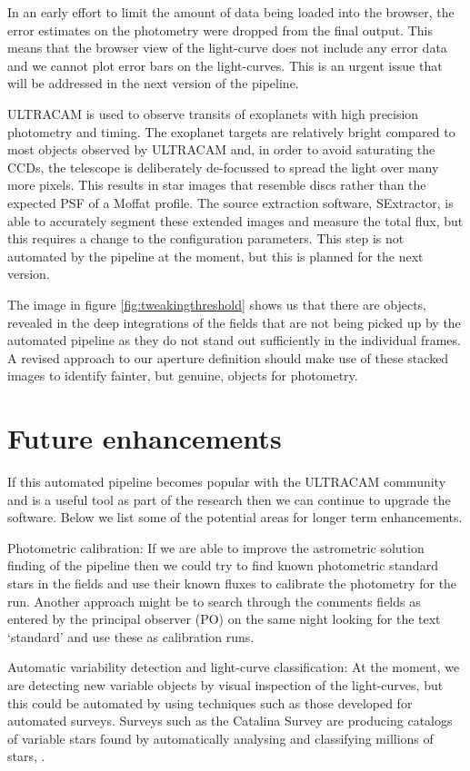 In an early effort to limit the amount of data being loaded into the browser, the error estimates on the photometry were dropped from the final output. This means that the browser view of the light-curve does not include any error data and we cannot plot error bars on the light-curves. This is an urgent issue that will be addressed in the next version of the pipeline. 

ULTRACAM is used to observe transits of exoplanets with high precision photometry and timing. The exoplanet targets are relatively bright compared to most objects observed by ULTRACAM and, in order to avoid saturating the CCDs, the telescope is deliberately de-focussed to spread the light over many more pixels. This results in star images that resemble discs rather than the expected PSF of a Moffat profile. The source extraction software, SExtractor, is able to accurately segment these extended images and measure the total flux, but this requires a change to the configuration parameters. This step is not automated by the pipeline at the moment, but this is planned for the next version. 

The image in figure \ref{fig:tweakingthreshold} shows us that there are objects, revealed in the deep integrations of the fields that are not being picked up by the automated pipeline as they do not stand out sufficiently in the individual frames. A revised approach to our aperture definition should make use of these stacked images to identify fainter, but genuine, objects for photometry. 

\section{Future enhancements}
If this automated pipeline becomes popular with the ULTRACAM community and is a useful tool as part of the research then we can continue to upgrade the software. Below we list some of the potential areas for longer term enhancements.

{Photometric calibration}: If we are able to improve the astrometric solution finding of the pipeline then we could try to find known photometric standard stars in the fields and use their known fluxes to calibrate the photometry for the run. Another approach might be to search through the comments fields as entered by the principal observer (PO) on the same night looking for the text `standard' and use these as calibration runs. 

{Automatic variability detection and light-curve classification}: At the moment, we are detecting new variable objects by visual inspection of the light-curves, but this could be automated by using techniques such as those developed for automated surveys. Surveys such as the Catalina Survey are producing catalogs of variable stars found by automatically analysing and classifying millions of stars, \citep{CatalinaCatalog}.

